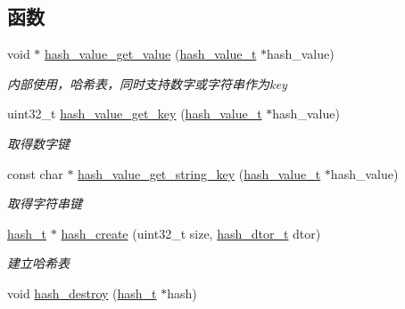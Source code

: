 \subsection*{函数}
\begin{DoxyCompactItemize}
\item 
void $\ast$ \hyperlink{a00056_ad0be61da4760c7d8dedbe56a81a688bb_ad0be61da4760c7d8dedbe56a81a688bb}{hash\+\_\+value\+\_\+get\+\_\+value} (\hyperlink{a00047_af7ecd66aeef0ce1b0495e5f65e77733e_af7ecd66aeef0ce1b0495e5f65e77733e}{hash\+\_\+value\+\_\+t} $\ast$hash\+\_\+value)
\begin{DoxyCompactList}\small\item\em 内部使用，哈希表，同时支持数字或字符串作为key \end{DoxyCompactList}\item 
uint32\+\_\+t \hyperlink{a00056_ab631c6680928561445077645be20aa76_ab631c6680928561445077645be20aa76}{hash\+\_\+value\+\_\+get\+\_\+key} (\hyperlink{a00047_af7ecd66aeef0ce1b0495e5f65e77733e_af7ecd66aeef0ce1b0495e5f65e77733e}{hash\+\_\+value\+\_\+t} $\ast$hash\+\_\+value)
\begin{DoxyCompactList}\small\item\em 取得数字键 \end{DoxyCompactList}\item 
const char $\ast$ \hyperlink{a00056_ac50440f30c8359bbcf04c00297910b7f_ac50440f30c8359bbcf04c00297910b7f}{hash\+\_\+value\+\_\+get\+\_\+string\+\_\+key} (\hyperlink{a00047_af7ecd66aeef0ce1b0495e5f65e77733e_af7ecd66aeef0ce1b0495e5f65e77733e}{hash\+\_\+value\+\_\+t} $\ast$hash\+\_\+value)
\begin{DoxyCompactList}\small\item\em 取得字符串键 \end{DoxyCompactList}\item 
\hyperlink{a00047_a188677c3015513590ab998e96b999966_a188677c3015513590ab998e96b999966}{hash\+\_\+t} $\ast$ \hyperlink{a00056_accead380199ce99795d29e9d178e849b_accead380199ce99795d29e9d178e849b}{hash\+\_\+create} (uint32\+\_\+t size, \hyperlink{a00047_a5dcd1ed9242185e4448352748e58573d_a5dcd1ed9242185e4448352748e58573d}{hash\+\_\+dtor\+\_\+t} dtor)
\begin{DoxyCompactList}\small\item\em 建立哈希表 \end{DoxyCompactList}\item 
void \hyperlink{a00056_a4073889d36e8fb6d2b2fcdea9d890db9_a4073889d36e8fb6d2b2fcdea9d890db9}{hash\+\_\+destroy} (\hyperlink{a00047_a188677c3015513590ab998e96b999966_a188677c3015513590ab998e96b999966}{hash\+\_\+t} $\ast$hash)

\end{DoxyCompactItemize}
